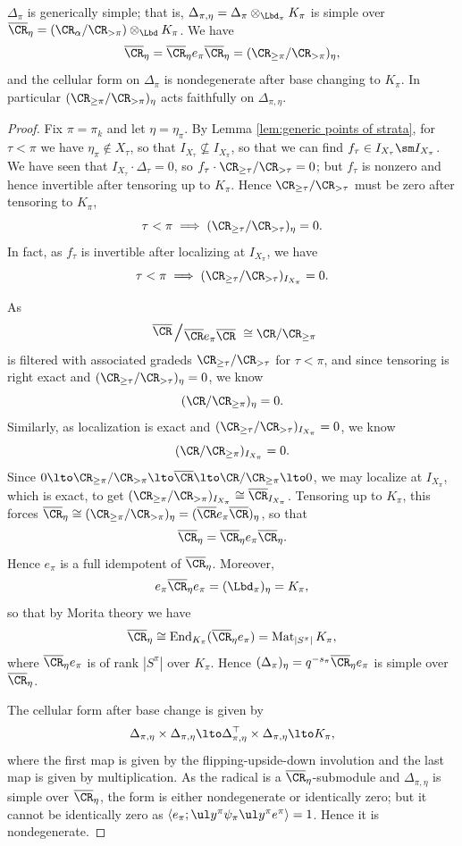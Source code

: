 \documentclass[11pt,reqno]{amsart}
\begin{document}
\begin{lemma}\label{lem:verma is generically simple}
    $\Delta_{\pi}$ is generically simple; that is, $\Delta_{\pi,\eta}=\Delta_{\pi}\otimes_{\Lbd_\pi}K_\pi$ is simple over $\ol\CR_\eta=(\CR_\alpha/\CR_{>\pi})\otimes_{\Lbd} K_\pi$. We have %
    \[\ol\CR_\eta=\ol\CR_\eta e_\pi \ol\CR_\eta = (\CR_{\ge\pi}/\CR_{>\pi})_\eta,\]
    and the cellular form on $\Delta_\pi$ is nondegenerate after base changing to $K_\pi$. In particular $(\CR_{\ge\pi}/\CR_{>\pi})_\eta$ acts faithfully on $\Delta_{\pi,\eta}$. 
\end{lemma}
\begin{proof}
    Fix $\pi=\pi_k$ and let $\eta=\eta_\pi$.  By Lemma \ref{lem:generic points of strata}, for $\tau<\pi$ we have $\eta_\pi\not\in X_\tau$, so that $I_{X_\tau}\not\subseteq I_{X_\pi}$, so that we can find $f_\tau\in I_{X_\tau}\sm I_{X_\pi}$. We have seen that $I_{X_\tau}\cdot\Delta_\tau=0$, so $f_\tau\cdot \CR_{\ge\tau}/\CR_{>\tau}=0$; but $f_\tau$ is nonzero and hence invertible after tensoring up to $K_\pi$. Hence $\CR_{\ge\tau}/\CR_{>\tau}$ must be zero after tensoring to $K_\pi$,
    \[\tau<\pi\implies (\CR_{\ge\tau}/\CR_{>\tau})_\eta=0.\] In fact, as $f_\tau$ is invertible after localizing at $I_{X_\pi}$, we have \[\tau<\pi\implies (\CR_{\ge\tau}/\CR_{>\tau})_{I_{X_\pi}}=0.\]

    As 
    \[\mfrac{\ol\CR}{\ol\CR e_\pi\ol\CR}\cong \CR/\CR_{\ge\pi}\] 
    is filtered with associated gradeds $\CR_{\ge\tau}/\CR_{>\tau}$ for $\tau<\pi$, and since tensoring is right exact and $(\CR_{\ge\tau}/\CR_{>\tau})_\eta=0$, we know
    \[(\CR/\CR_{\ge\pi})_\eta=0.\] Similarly, as localization is exact and $(\CR_{\ge\tau}/\CR_{>\tau})_{I_{X_\pi}}=0$, we know \[(\CR/\CR_{\ge\pi})_{I_{X_\pi}}=0.\] 
    Since $0\lto \CR_{\ge\pi}/\CR_{>\pi}\lto \ol\CR\lto \CR/\CR_{\ge\pi}\lto 0$, we may localize at $I_{X_\pi}$, which is exact, to get $(\CR_{\ge\pi}/\CR_{>\pi})_{I_{X_\pi}}\cong \ol\CR_{I_{X_\pi}}$. Tensoring up to $K_\pi$, this forces $\ol\CR_\eta\cong (\CR_{\ge\pi}/\CR_{>\pi})_\eta=(\ol\CR e_\pi\ol\CR)_\eta$, so that
    \[\ol\CR_\eta=\ol\CR_\eta e_\pi\ol\CR_\eta.\] 
    Hence $e_\pi$ is a full idempotent of $\ol\CR_\eta$. Moreover, 
    \[e_\pi \ol\CR_\eta e_\pi =(\Lbd_\pi)_\eta=K_\pi,\] 
    so that by Morita theory we have
    \[\ol\CR_\eta\cong \End_{K_\pi}(\ol\CR_\eta e_\pi)=\Mat_{|S^\pi|} K_\pi,\] 
    where $\ol\CR_\eta e_\pi$ is of rank $|S^\pi|$ over $K_\pi$. Hence $(\Delta_\pi)_\eta = q^{-s_\pi}\ol\CR_\eta e_\pi$ is simple over $\ol\CR_\eta$. 

    The cellular form after base change is given by
    \[\Delta_{\pi,\eta}\times\Delta_{\pi,\eta}\lto \Delta_{\pi,\eta}^\top\times\Delta_{\pi,\eta}\lto K_\pi,\] 
    where the first map is given by the flipping-upside-down involution and the last map is given by multiplication. As the radical is a $\ol\CR_\eta$-submodule and $\Delta_{\pi,\eta}$ is simple over $\ol\CR_\eta$, the form is either nondegenerate or identically zero; but it cannot be identically zero as $\wan{e_\pi;\ul y^\pi \psi_\pi \ul y^\pi e^\pi}=1$. Hence it is nondegenerate. 
\end{proof}
\end{document}
